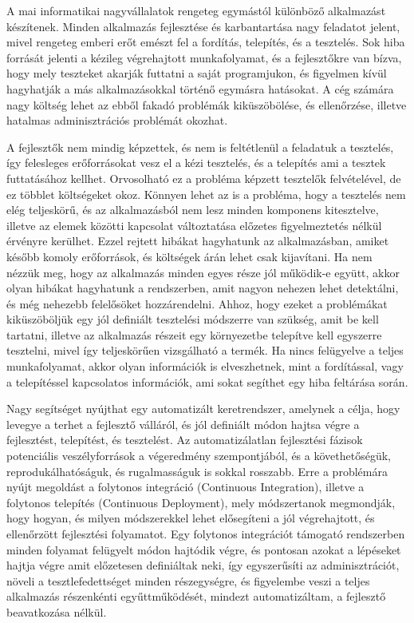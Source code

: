 \documentclass[11pt,magyar,a4paper,twoside,]{report}
\begin{document}
A mai informatikai nagyvállalatok rengeteg egymástól különböző
alkalmazást készítenek. Minden alkalmazás fejlesztése és karbantartása
nagy feladatot jelent, mivel rengeteg emberi erőt emészt fel a fordítás,
telepítés, és a tesztelés. Sok hiba forrását jelenti a kézileg
végrehajtott munkafolyamat, és a fejlesztőkre van bízva, hogy mely
teszteket akarják futtatni a saját programjukon, és figyelmen kívül
hagyhatják a más alkalmazásokkal történő egymásra hatásokat. A cég
számára nagy költség lehet az ebből fakadó problémák kiküszöbölése, és
ellenőrzése, illetve hatalmas adminisztrációs problémát okozhat.

A fejlesztők nem mindig képzettek, és nem is feltétlenül a feladatuk a
tesztelés, így felesleges erőforrásokat vesz el a kézi tesztelés, és a
telepítés ami a tesztek futtatásához kellhet. Orvosolható ez a probléma
képzett tesztelők felvételével, de ez többlet költségeket okoz. Könnyen
lehet az is a probléma, hogy a tesztelés nem elég teljeskörű, és az
alkalmazásból nem lesz minden komponens kitesztelve, illetve az elemek
közötti kapcsolat változtatása előzetes figyelmeztetés nélkül érvényre
kerülhet. Ezzel rejtett hibákat hagyhatunk az alkalmazásban, amiket
később komoly erőforrások, és költségek árán lehet csak kijavítani. Ha
nem nézzük meg, hogy az alkalmazás minden egyes része jól működik-e
együtt, akkor olyan hibákat hagyhatunk a rendszerben, amit nagyon
nehezen lehet detektálni, és még nehezebb felelősöket hozzárendelni.
Ahhoz, hogy ezeket a problémákat kiküszöböljük egy jól definiált
tesztelési módszerre van szükség, amit be kell tartatni, illetve az
alkalmazás részeit egy környezetbe telepítve kell egyszerre tesztelni,
mivel így teljeskörűen vizsgálható a termék. Ha nincs felügyelve a
teljes munkafolyamat, akkor olyan információk is elveszhetnek, mint a
fordítással, vagy a telepítéssel kapcsolatos információk, ami sokat
segíthet egy hiba feltárása során.

Nagy segítséget nyújthat egy automatizált keretrendszer, amelynek a
célja, hogy levegye a terhet a fejlesztő válláról, és jól definiált
módon hajtsa végre a fejlesztést, telepítést, és tesztelést. Az
automatizálatlan fejlesztési fázisok potenciális veszélyforrások a
végeredmény szempontjából, és a követhetőségük, reprodukálhatóságuk, és
rugalmasságuk is sokkal rosszabb. Erre a problémára nyújt megoldást a
folytonos integráció (Continuous Integration), illetve a folytonos
telepítés (Continuous Deployment), mely módszertanok megmondják, hogy
hogyan, és milyen módszerekkel lehet elősegíteni a jól végrehajtott, és
ellenőrzött fejlesztési folyamatot. Egy folytonos integrációt támogató
rendszerben minden folyamat felügyelt módon hajtódik végre, és pontosan
azokat a lépéseket hajtja végre amit előzetesen definiáltak neki, így
egyszerűsíti az adminisztrációt, növeli a tesztlefedettséget minden
részegységre, és figyelembe veszi a teljes alkalmazás részenkénti
egyűttműködését, mindezt automatizáltam, a fejlesztő beavatkozása
nélkül.
\end{document}

